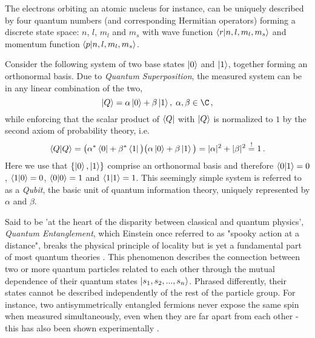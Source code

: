 The electrons orbiting an atomic nucleus for instance, can be uniquely described by four quantum numbers (and corresponding Hermitian operators) forming a discrete state space: $n$, $l$, $m_l$ and $m_s$ with wave function $\braket{r | n, l, m_l, m_s}$ and momentum function $\braket{p | n, l, m_l, m_s}$.

Consider the following system of two base states $\ket{0}$ and $\ket{1}$, together forming an orthonormal basis.
Due to \textit{Quantum Superposition}, the measured system can be in any linear combination of the two,
$$\ket{Q} = \alpha \ket{0} + \beta \ket{1},\; \alpha, \beta \in \C\,,$$
while enforcing that the scalar product of $\bra{Q}$ with $\ket{Q}$ is normalized to $1$ by the second axiom of probability theory, i.e. $$\braket{Q | Q} = \big(\alpha^* \bra{0} + \beta^* \bra{1}\big)\big(\alpha \ket{0} + \beta \ket{1}\big) = |\alpha|^2 + |\beta|^2 \overset{!}{=} 1 \,.$$
Here we use that $\{\ket{0}, \ket{1}\}$ comprise an orthonormal basis and therefore $\braket{0|1} = 0$, $\braket{1|0} = 0$, $\braket{0|0} = 1$ and $\braket{1|1} = 1$.
This seemingly simple system is referred to as a \textit{Qubit}, the basic unit of quantum information theory, uniquely represented by $\alpha$ and $\beta$.

Said to be 'at the heart of the disparity between classical and quantum physics', \textit{Quantum Entanglement}, which Einstein once referred to as "spooky action at a distance", breaks the physical principle of locality but is yet a fundamental part of most quantum theories \parencite{1989-unspeakable-qm}.
This phenomenon describes the connection between two or more quantum particles related to each other through the mutual dependence of their quantum states $\ket{s_1, s_2, ..., s_n}$.
Phrased differently, their states cannot be described independently of the rest of the particle group.
For instance, two antisymmetrically entangled fermions never expose the same spin when measured simultaneously, even when they are far apart from each other - this has also been shown experimentally \parencite{2013-entanglement-proof}.

